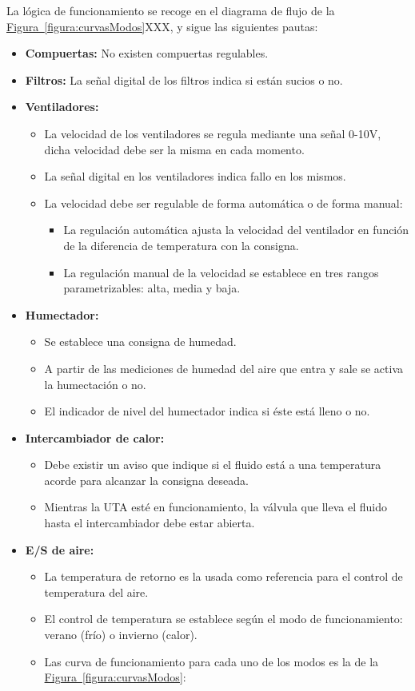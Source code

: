 La lógica de funcionamiento se recoge en el diagrama de flujo de la \hyperref[figura:curvasModos]{Figura~\ref{figura:curvasModos}}XXX, y sigue las siguientes pautas:

\begin{itemize}
  \item \textbf{Compuertas:} No existen compuertas regulables.
  \item \textbf{Filtros:} La señal digital de los filtros indica si están sucios o no.
  \item \textbf{Ventiladores:} 
  \begin{itemize}
    \item La velocidad de los ventiladores se regula mediante una señal 0-10V, dicha velocidad debe ser la misma en cada momento.
    \item La señal digital en los ventiladores indica fallo en los mismos.
    \item La velocidad debe ser regulable de forma automática o de forma manual:
    \begin{itemize}
      \item La regulación automática ajusta la velocidad del ventilador en función de la diferencia de temperatura con la consigna.
      \item La regulación manual de la velocidad se establece en tres rangos parametrizables: alta, media y baja.
    \end{itemize}
  \end{itemize} 
  \item \textbf{Humectador:} 
  \begin{itemize}
    \item Se establece una consigna de humedad.
    \item A partir de las mediciones de humedad del aire que entra y sale se activa la humectación o no.
    \item El indicador de nivel del humectador indica si éste está lleno o no.
  \end{itemize}
  \item \textbf{Intercambiador de calor:}
  \begin{itemize}
    \item Debe existir un aviso que indique si el fluido está a una temperatura acorde para alcanzar la consigna deseada.
    \item Mientras la UTA esté en funcionamiento, la válvula que lleva el fluido hasta el intercambiador debe estar abierta.
  \end{itemize}
  \item \textbf{E/S de aire:}
  \begin{itemize}
    \item La temperatura de retorno es la usada como referencia para el control de temperatura del aire.
    \item El control de temperatura se establece según el modo de funcionamiento: verano (frío) o invierno (calor).
    \item Las curva de funcionamiento para cada uno de los modos es la de la \hyperref[figura:curvasModos]{Figura~\ref{figura:curvasModos}}:
  \end{itemize}
\end{itemize}

